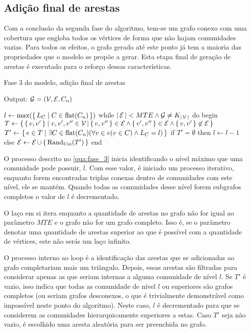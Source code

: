 \documentclass[notes.tex]{subfiles}
\begin{document}
\subsection{Adição final de arestas}

Com a conclusão da segunda fase do algoritmo, tem-se um grafo conexo com uma cobertura que engloba todos os vértices de forma que não hajam comunidades vazias.
Para todos os efeitos, o grafo gerado até este ponto já tem a maioria das propriedades que o modelo se propõe a gerar.
Esta etapa final de geração de arestas é executado para o reforço dessas características.

\begin{quadro}[htbp]
\caption{Fase 3 do modelo, adição final de arestas}
\label{qua:fase_3}
\begin{algorithm}
Output: $\operatorname{\mathcal{G}} = (\operatorname{\mathcal{V}}, \operatorname{\mathcal{E}}, C_n)$

$l \leftarrow \max(\set{L_C | C \in \text{flat}(C_n)})$
while $|\operatorname{\mathcal{E}}| < MTE \land \operatorname{\mathcal{G}} \neq K_{|\operatorname{\mathcal{V}}|}$ do
begin
    $T \leftarrow \set{\set{v, v'} | v, v', v'' \in \operatorname{\mathcal{V}}| \set{v, v''} \in \operatorname{\mathcal{E}}\land \set{v', v''} \in \operatorname{\mathcal{E}}\land \set{v, v'} \not\in \operatorname{\mathcal{E}}}$
    $T' \leftarrow \set{e \in T | \exists C \in \text{flat}(C_n) (\forall v \in e (v \in C) \land L_C = l)}$
    if $T' = \emptyset$ then  $l \leftarrow l - 1$
    else $\operatorname{\mathcal{E}} \leftarrow \operatorname{\mathcal{E}} \cup \set{\text{Rand}_\text{Uni}(T')}$
end
\end{algorithm}
\end{quadro}

O processo descrito no \autoref{qua:fase_3} inicia identificando o nível máximo que uma comunidade pode possuir, $l$.
Com esse valor, é iniciado um processo iterativo, enquanto forem encontradas triplas conexas dentro de comunidades com este nível, ele se mantém.
Quando todas as comunidades desse nível forem subgrafos completos o valor de $l$ é decrementado.

O laço em si itera enquanto a quantidade de arestas no grafo não for igual ao parâmetro $MTE$ e o grafo não for um grafo completo. 
Isso é, se o parâmetro denotar uma quantidade de arestas superior ao que é possível com a quantidade de vértices, este não serás um laço infinito.

O processo interno ao loop é a identificação das arestas que se adicionadas ao grafo completariam mais um triângulo.
Depois, essas arestas são filtradas para considerar apenas as que seriam internas a alguma comunidade de nível $l$.
Se  $T'$ é vazio, isso indica que todas as comunidade de nível  $l$ ou superiores são grafos completos (ou seriam grafos desconexos, o que é trivialmente demonstrável como impossível neste ponto do algoritmo).
Neste caso, $l$ é decrementado para que se considerem as comunidades hierarquicamente superiores a estas.
Caso  $T'$ seja não vazio, é escolhido uma aresta aleatória para ser preenchida no grafo.
\end{document}

